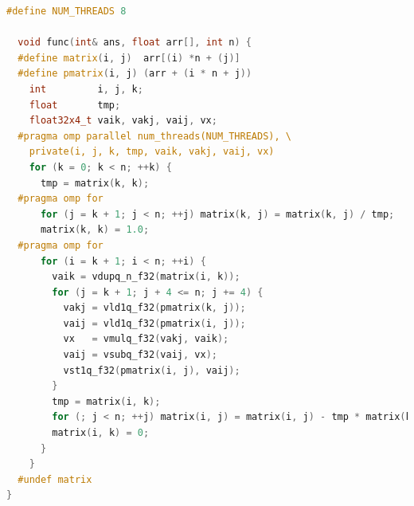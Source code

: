 \documentclass[a4paper]{article}
\begin{document}
\begin{lstlisting}[title=arm OpenMP + NEON 并行化加速,frame=trbl,language={C++}]
  #define NUM_THREADS 8

  void func(int& ans, float arr[], int n) {
  #define matrix(i, j)  arr[(i) *n + (j)]
  #define pmatrix(i, j) (arr + (i * n + j))
    int         i, j, k;
    float       tmp;
    float32x4_t vaik, vakj, vaij, vx;
  #pragma omp parallel num_threads(NUM_THREADS), \
    private(i, j, k, tmp, vaik, vakj, vaij, vx)
    for (k = 0; k < n; ++k) {
      tmp = matrix(k, k);
  #pragma omp for
      for (j = k + 1; j < n; ++j) matrix(k, j) = matrix(k, j) / tmp;
      matrix(k, k) = 1.0;
  #pragma omp for
      for (i = k + 1; i < n; ++i) {
        vaik = vdupq_n_f32(matrix(i, k));
        for (j = k + 1; j + 4 <= n; j += 4) {
          vakj = vld1q_f32(pmatrix(k, j));
          vaij = vld1q_f32(pmatrix(i, j));
          vx   = vmulq_f32(vakj, vaik);
          vaij = vsubq_f32(vaij, vx);
          vst1q_f32(pmatrix(i, j), vaij);
        }
        tmp = matrix(i, k);
        for (; j < n; ++j) matrix(i, j) = matrix(i, j) - tmp * matrix(k, j);
        matrix(i, k) = 0;
      }
    }
  #undef matrix
}
\end{lstlisting}
\end{document}
